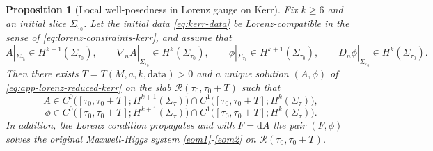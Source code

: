\documentclass[11pt]{article}
\numberwithin{equation}{section}
\theoremstyle{plain}
\newtheorem{proposition}[theorem]{Proposition}
\theoremstyle{definition}
\theoremstyle{remark}
\newcommand{\dd}{\mathrm{d}}
\begin{document}
\begin{proposition}[Local well-posedness in Lorenz gauge on Kerr]\label{prop:local-wp-kerr}
Fix $k\ge 6$ and an initial slice $\Sigma_{\tau_0}$.
Let the initial data \eqref{eq:kerr-data} be Lorenz-compatible in the sense of \eqref{eq:lorenz-constraints-kerr}, and assume that
\begin{equation}\label{eq:app-kerr-data-sobolev}
A|_{\Sigma_{\tau_0}}\in H^{k+1}(\Sigma_{\tau_0}),
\qquad
\nabla_n A|_{\Sigma_{\tau_0}}\in H^{k}(\Sigma_{\tau_0}),
\qquad
\phi|_{\Sigma_{\tau_0}}\in H^{k+1}(\Sigma_{\tau_0}),
\qquad
D_n\phi|_{\Sigma_{\tau_0}}\in H^{k}(\Sigma_{\tau_0}).
\end{equation}
Then there exists $T=T(M,a,k,\text{data})>0$ and a unique solution $(A,\phi)$ of \eqref{eq:app-lorenz-reduced-kerr} on the slab $\mathcal R(\tau_0,\tau_0+T)$ such that
\begin{equation}
A\in C^0\!\bigl([\tau_0,\tau_0+T];H^{k+1}(\Sigma_\tau)\bigr)\cap C^1\!\bigl([\tau_0,\tau_0+T];H^{k}(\Sigma_\tau)\bigr),
\end{equation}
\begin{equation}
\phi\in C^0\!\bigl([\tau_0,\tau_0+T];H^{k+1}(\Sigma_\tau)\bigr)\cap C^1\!\bigl([\tau_0,\tau_0+T];H^{k}(\Sigma_\tau)\bigr).
\end{equation}
In addition, the Lorenz condition propagates and with $F=\dd A$ the pair $(F,\phi)$ solves the original Maxwell-Higgs system \eqref{eom1}-\eqref{eom2} on $\mathcal R(\tau_0,\tau_0+T)$.
\end{proposition}
\end{document}
